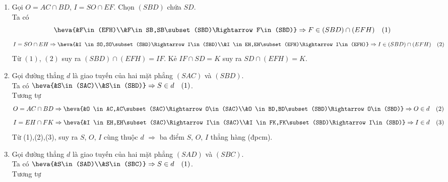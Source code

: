 \begin{bt}
{\begin{center}
		\end{center}
		\begin{enumerate}
			\item Gọi $O=AC\cap BD$, $I=SO\cap EF$. Chọn $(SBD)$ chứa $SD$.\\
			Ta có $$\heva{&F\in (EFH)\\&F\in SB,SB\subset (SBD)\Rightarrow F\in(SBD)}\Rightarrow F\in(SBD)\cap(EFH)\quad(1)$$ 
			$$I=SO\cap EH \Rightarrow \heva{&I \in SO,SO\subset (SBD)\Rightarrow I\in(SBD)\\&I \in EH,EH\subset (EFH)\Rightarrow I\in(EFH)}\Rightarrow I\in(SBD)\cap(EFH)\quad(2)$$	
			Từ $(1)$, $(2)$ suy ra $(SBD)\cap(EFH)=IF$. Kẻ $IF\cap SD=K$ suy ra $SD\cap(EFH)=K$.
			\item Gọi đường thẳng $d$ là giao tuyến của hai mặt phẳng $(SAC)$ và $(SBD)$.\\
			Ta có 
			$\heva{&S\in(SAC)\\&S\in(SBD)}\Rightarrow S\in d\quad (1)$.\\
			Tương tự
			$$O=AC\cap BD \Rightarrow \heva{&O \in AC,AC\subset (SAC)\Rightarrow O\in(SAC)\\&O \in BD,BD\subset (SBD)\Rightarrow O\in(SBD)}\Rightarrow O\in d\quad (2)$$
			$$I=EH\cap FK \Rightarrow \heva{&I \in EH,EH\subset (SAC)\Rightarrow I\in(SAC)\\&I \in FK,FK\subset (SBD)\Rightarrow I\in(SBD)}\Rightarrow I\in d\quad (3)$$
			Từ (1),(2),(3), suy ra $S$, $O$, $I$ cùng thuộc $d$ $\Rightarrow$ ba điểm $S$, $O$, $I$ thẳng hàng (đpcm).
			\item Gọi đường thẳng $d$ là giao tuyến của hai mặt phẳng $(SAD)$ và $(SBC)$.\\
			Ta có 
			$\heva{&S\in(SAD)\\&S\in(SBC)}\Rightarrow S\in d\quad (1)$.\\
			Tương tự

\end{enumerate}}
\end{bt}
